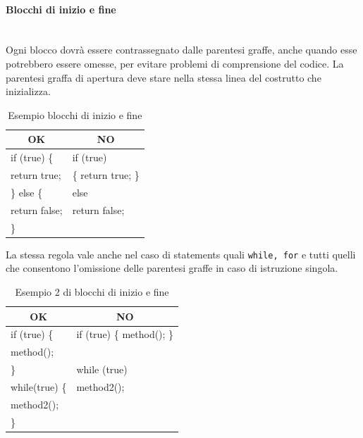 \paragraph{Blocchi di inizio e fine}\mbox{}\\[0.4cm]
Ogni blocco dovrà essere contrassegnato dalle parentesi graffe, anche quando esse potrebbero essere omesse, per evitare problemi di comprensione del codice. La parentesi graffa di apertura deve stare nella stessa linea del costrutto che inizializza.
\begin{table} [H]
	\begin{center}
		\begin{tabular}{ | l | l |}
			\multicolumn{1}{c}{\textbf{OK}}&\multicolumn{1}{c}{\textbf{NO}}\\ 
			\hline
			if (true) \{ 			   &  if (true)\\
			\hspace{0.5cm}return true;          & \hspace{0.5cm} \{ return true; \}\\
			\} else \{ 					& else\\
			\hspace{0.5cm}return false;          & \hspace{0.5cm}return false;\\
			\}								& \\
			\hline
		\end{tabular}
	\end{center}
	\caption{Esempio blocchi di inizio e fine}
\end{table}
La stessa regola vale anche nel caso di statements quali \texttt{while, for} e tutti quelli che consentono l’omissione delle parentesi graffe in caso di istruzione singola.
\begin{table} [H]
	\begin{center}
		\begin{tabular}{ | l | l |}
			\multicolumn{1}{c}{\textbf{OK}}&\multicolumn{1}{c}{\textbf{NO}}\\ 
			\hline
			if (true) \{ 			   &  if (true) \{ method(); \}\\
			\hspace{0.5cm}method();          &   \\
			\}  					& while (true)\\     
			while(true) \{          & \hspace{0.5cm}method2(); \\
			\hspace{0.5cm}method2();          & \\
			\}								& \\
			\hline
		\end{tabular}
	\end{center}
	\caption{Esempio 2 di blocchi di inizio e fine}
\end{table}
